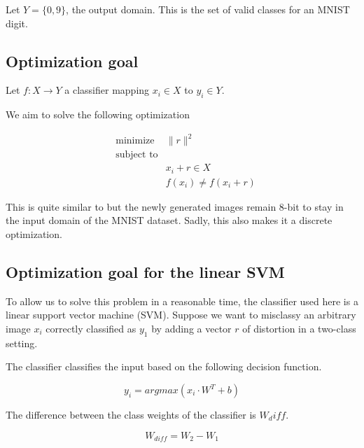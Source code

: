 \documentclass{article} %
\begin{document}
Let \begin{math} Y = \{0, 9\} \end{math}, the output domain.
This is the set of valid classes for an MNIST digit.


\subsection{Optimization goal}

Let \begin{math} f:X \rightarrow  Y \end{math} a classifier mapping $x_i \in
X$ to $y_i \in Y$.

We aim to solve the following optimization

\begin{equation}
\label{eq:optimization}
\begin{aligned}
& {\text{minimize}}
&   \lVert{r} \rVert^2\\
& \text{subject to} \\
& & x_i + r \in X \\
& & f(x_i) \neq f(x_i + r)
\end{aligned}
\end{equation}

This is quite similar to \citep{szegedy_intriguing_2013} but the newly
generated images remain 8-bit to stay in the input domain of the MNIST dataset.
Sadly, this also makes it a discrete optimization.


\subsection{Optimization goal for the linear SVM}
To allow us to solve this problem in a reasonable time, the classifier used
here is a linear support vector machine (SVM).
Suppose we want to misclassy an arbitrary image $x_i$ correctly classified
as $y_1$ by adding a vector $r$ of distortion in a two-class setting.

The classifier classifies the input based on the following decision function.

\begin{equation}
\label{eq:decision_function}
  y_i = argmax (x_i \cdot W^T + b)
\end{equation}


The difference between the class weights of the classifier is $W_diff$.

\begin{equation}
\label{eq:difference}
  W_{diff} = W_2 - W_1
\end{equation}
\end{document}
